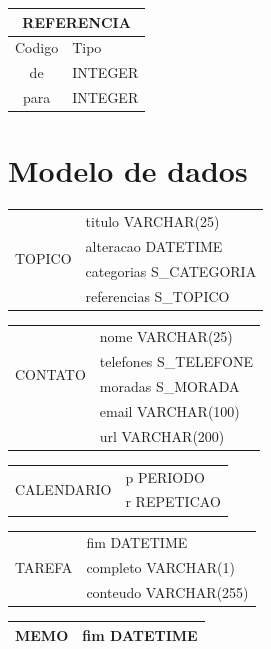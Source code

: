 \documentclass[a4paper,12pt]{article}
\begin{document}
	\begin{tabular}{|c|l|} \hline
		\multicolumn{2}{|c|}{REFERENCIA} \\ \hline
		Codigo & Tipo \\ \hline
		de & INTEGER \\
		para & INTEGER \\ \hline
		\end{tabular}
	
\section{Modelo de dados}

	\begin{multicols}{2}
		\begin{tabular}{|c|l|} \hline
		\multirow{4}{*}{TOPICO}
		& titulo VARCHAR(25) \\
		& alteracao DATETIME \\ 
		& categorias S\_CATEGORIA \\
		& referencias S\_TOPICO\\ \hline 
		\end{tabular}
		
		\begin{tabular}{|c|l|} \hline
		\multirow{4}{*}{CONTATO}
		& nome VARCHAR(25) \\
		& telefones S\_TELEFONE \\ 
		& moradas S\_MORADA \\
		& email VARCHAR(100) \\ 
		& url VARCHAR(200) \\ \hline 
		\end{tabular}
		
		\begin{tabular}{|c|l|} \hline
		\multirow{2}{*}{CALENDARIO}
		& p PERIODO \\
		& r REPETICAO \\ \hline 
		\end{tabular}
		
		\begin{tabular}{|c|l|} \hline
		\multirow{3}{*}{TAREFA}
		& fim DATETIME \\
		& completo VARCHAR(1) \\ 
		& conteudo VARCHAR(255) \\ \hline 
		\end{tabular}
		
		\begin{tabular}{|c|l|} \hline
		MEMO & fim DATETIME \\ \hline
		\end{tabular}
		

\end{multicols}
\end{document}
